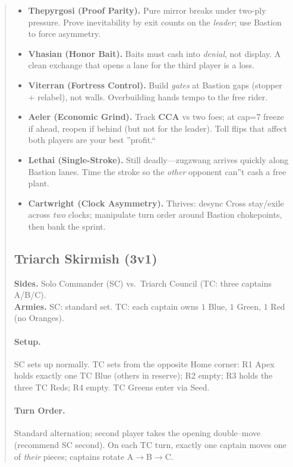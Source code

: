 \documentclass[11pt]{article}
\begin{document}
\begin{quote}
\begin{tcolorbox}[enhanced,breakable,title={Triad (3-Player, Bastion) --- What Changes},
  colback=white,colframe=royal,boxrule=0.8pt]
\begin{itemize}[leftmargin=1.1em,itemsep=0.3em]
\item \textbf{Thepyrgosi (Proof Parity).} Pure mirror breaks under two-ply pressure. Prove inevitability by exit counts on the \emph{leader}; use Bastion to force asymmetry.

\item \textbf{Vhasian (Honor Bait).} Baits must cash into \emph{denial}, not display. A clean exchange that opens a lane for the third player is a loss.

\item \textbf{Viterran (Fortress Control).} Build \emph{gates} at Bastion gaps (stopper + relabel), not walls. Overbuilding hands tempo to the free rider.

\item \textbf{Aeler (Economic Grind).} Track \textbf{CCA} vs two foes; at cap=7 freeze if ahead, reopen if behind (but not for the leader). Toll flips that affect both players are your best ''profit.``

\item \textbf{Lethai (Single-Stroke).} Still deadly---zugzwang arrives quickly along Bastion lanes. Time the stroke so the \emph{other} opponent can''t cash a free plant.

\item \textbf{Cartwright (Clock Asymmetry).} Thrives: desync Cross stay/exile across \emph{two} clocks; manipulate turn order around Bastion chokepoints, then bank the sprint.
\end{itemize}
\end{tcolorbox}

\clearpage

\subsection{Triarch Skirmish (3v1)}
\textbf{Sides.} Solo Commander (SC) vs.\ Triarch Council (TC: three captains A/B/C).\\
\textbf{Armies.} SC: standard set. TC: each captain owns $1$ Blue, $1$ Green, $1$ Red (no Oranges).

\paragraph{Setup.} SC sets up normally. TC sets from the opposite Home corner: R1 Apex holds exactly one TC Blue (others in reserve); R2 empty; R3 holds the three TC Reds; R4 empty. TC Greens enter via Seed.

\paragraph{Turn Order.} Standard alternation; second player takes the opening double--move (recommend SC second). On each TC turn, exactly one captain moves one of \emph{their} pieces; captains rotate A$\to$B$\to$C.


\end{quote}
\end{document}
